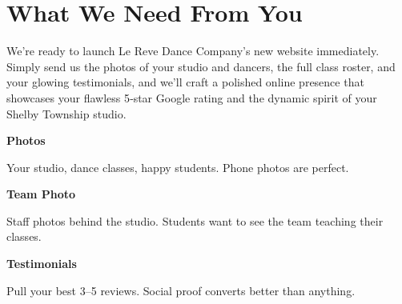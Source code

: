 \documentclass[11pt,letterpaper]{article}
\begin{document}
\vspace{0.2em}

\section*{What We Need From You}

We’re ready to launch Le Reve Dance Company’s new website immediately. Simply send us the photos of your studio and dancers, the full class roster, and your glowing testimonials, and we’ll craft a polished online presence that showcases your flawless 5‑star Google rating and the dynamic spirit of your Shelby Township studio.

\vspace{0.12em}

\noindent\begin{minipage}[t]{0.48\textwidth}
\begin{tcolorbox}[colframe=accent-teal, boxrule=1pt, left=0.7em, right=0.7em, top=0.5em, bottom=0.5em, arc=4pt, boxsep=0pt]
{\bfseries\small\color{accent-teal}Photos}

\vspace{0.15em}

{\small Your studio, dance classes, happy students. Phone photos are perfect.}
\end{tcolorbox}

\vspace{0.1em}

\begin{tcolorbox}[colframe=accent-teal, boxrule=1pt, left=0.7em, right=0.7em, top=0.5em, bottom=0.5em, arc=4pt, boxsep=0pt]
{\bfseries\small\color{accent-teal}Team Photo}

\vspace{0.15em}

{\small Staff photos behind the studio. Students want to see the team teaching their classes.}
\end{tcolorbox}

\vspace{0.1em}

\begin{tcolorbox}[colframe=accent-teal, boxrule=1pt, left=0.7em, right=0.7em, top=0.5em, bottom=0.5em, arc=4pt, boxsep=0pt]
{\bfseries\small\color{accent-teal}Testimonials}

\vspace{0.15em}

{\small Pull your best 3--5 reviews. Social proof converts better than anything.}
\end{tcolorbox}
\end{minipage}
\end{document}
